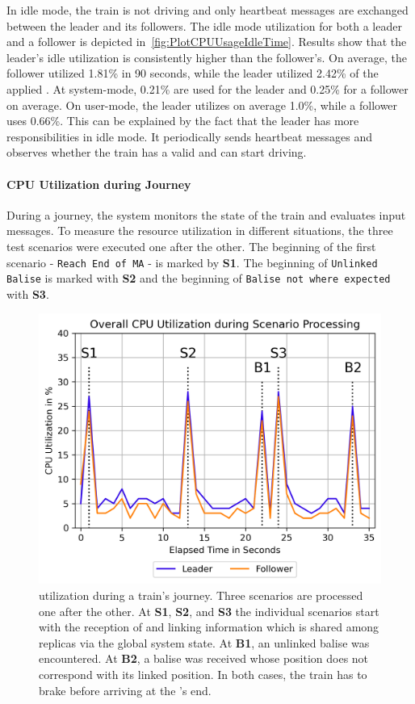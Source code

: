 In idle mode, the train is not driving and only heartbeat messages are exchanged between the leader and its followers.
The idle mode  utilization for both a leader and a follower is depicted in~\autoref{fig:PlotCPUUsageIdleTime}.
Results show that the leader's idle  utilization is consistently higher than the follower's.
On average, the follower utilized 1.81\% in 90 seconds, while the leader utilized 2.42\% of the applied .
At system-mode, 0.21\% are used for the leader and 0.25\% for a follower on average.
On user-mode, the leader utilizes on average 1.0\%, while a follower uses 0.66\%.
This can be explained by the fact that the leader has more responsibilities in idle mode.
It periodically sends heartbeat messages and observes whether the train has a valid  and can start driving.


\paragraph{CPU Utilization during Journey}

During a journey, the system monitors the state of the train and evaluates input messages.
To measure the resource utilization in different situations, the three test scenarios were executed one after the other.
The beginning of the first scenario - \texttt{Reach End of MA} - is marked by \textbf{S1}.
The beginning of \texttt{Unlinked Balise} is marked with \textbf{S2} and the beginning of \texttt{Balise not where expected} with \textbf{S3}.

\begin{figure}[!htb]
	\centering
	\includegraphics[width=0.8\linewidth]{images/plots/TotalCPUUsage}
	\caption{ utilization during a train's journey. Three scenarios are processed one after the other. At \textbf{S1}, \textbf{S2}, and \textbf{S3} the individual scenarios start with the reception of  and linking information which is shared among replicas via the global system state. At \textbf{B1}, an unlinked balise was encountered. At \textbf{B2}, a balise was received whose position does not correspond with its linked position. In both cases, the train has to brake before arriving at the 's end.}
	\label{fig:PlotTotalCPUUsage}
\end{figure}

